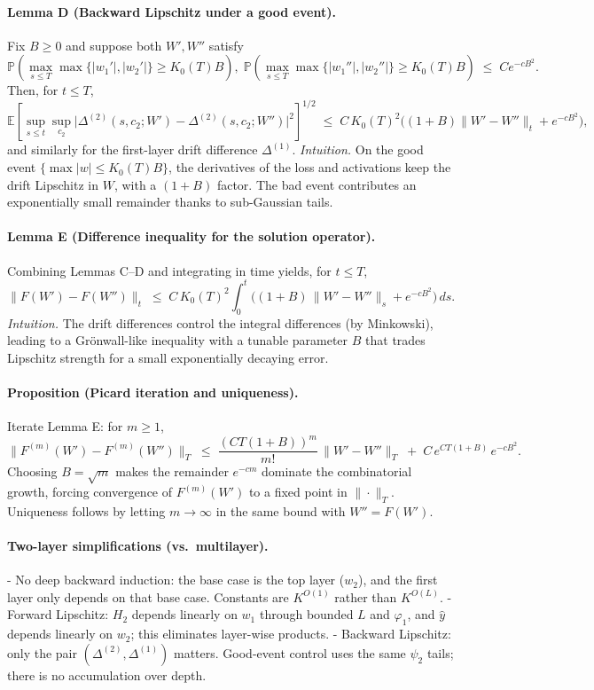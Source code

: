 \documentclass[11pt]{article}
\newcommand{\E}{\mathbb{E}}
\newcommand{\Pp}{\mathbb{P}}
\newcommand{\1}{\mathbbm{1}}
\begin{document}
\paragraph{Lemma D (Backward Lipschitz under a good event).}
Fix $B\ge 0$ and suppose both $W',W''$ satisfy
\[
\Pp\!\left(\max_{s\le T}\max\{|w_1'|,|w_2'|\}\ge K_0(T)B\right),\;\Pp\!\left(\max_{s\le T}\max\{|w_1''|,|w_2''|\}\ge K_0(T)B\right) \;\le\; C e^{-cB^2}.
\]
Then, for $t\le T$,
\[
\E\!\left[\sup_{s\le t}\sup_{c_2}\big|\Delta^{(2)}(s,c_2;W')-\Delta^{(2)}(s,c_2;W'')\big|^2\right]^{\!\!1/2} \;\le\; C\,K_0(T)^2\Big((1+B)\|W'-W''\|_t + e^{-cB^2}\Big),
\]
and similarly for the first-layer drift difference $\Delta^{(1)}$.
\emph{Intuition.} On the good event $\{\max|w|\le K_0(T)B\}$, the derivatives of the loss and activations keep the drift Lipschitz in $W$, with a $(1+B)$ factor. The bad event contributes an exponentially small remainder thanks to sub-Gaussian tails.

\paragraph{Lemma E (Difference inequality for the solution operator).}
Combining Lemmas C–D and integrating in time yields, for $t\le T$,
\[
\|F(W')-F(W'')\|_t \;\le\; C\,K_0(T)^2 \int_0^t \Big((1+B)\,\|W'-W''\|_s + e^{-cB^2}\Big)\,ds.
\]
\emph{Intuition.} The drift differences control the integral differences (by Minkowski), leading to a Grönwall-like inequality with a tunable parameter $B$ that trades Lipschitz strength for a small exponentially decaying error.

\paragraph{Proposition (Picard iteration and uniqueness).}
Iterate Lemma E: for $m\ge 1$,
\[
\big\|F^{(m)}(W')-F^{(m)}(W'')\big\|_T \;\le\; \frac{(C T (1+B))^{m}}{m!}\,\|W'-W''\|_T \;+\; C\,e^{C T (1+B)}\,e^{-cB^2}.
\]
Choosing $B=\sqrt{m}$ makes the remainder $e^{-c m}$ dominate the combinatorial growth, forcing convergence of $F^{(m)}(W')$ to a fixed point in $\|\cdot\|_T$. Uniqueness follows by letting $m\to\infty$ in the same bound with $W''=F(W')$.

\paragraph{Two-layer simplifications (vs.\ multilayer).}
- No deep backward induction: the base case is the top layer ($w_2$), and the first layer only depends on that base case. Constants are $K^{O(1)}$ rather than $K^{O(L)}$.
- Forward Lipschitz: $H_2$ depends linearly on $w_1$ through bounded $L$ and $\varphi_1$, and $\hat y$ depends linearly on $w_2$; this eliminates layer-wise products.
- Backward Lipschitz: only the pair $(\Delta^{(2)},\Delta^{(1)})$ matters. Good-event control uses the same $\psi_2$ tails; there is no accumulation over depth.
\end{document}
